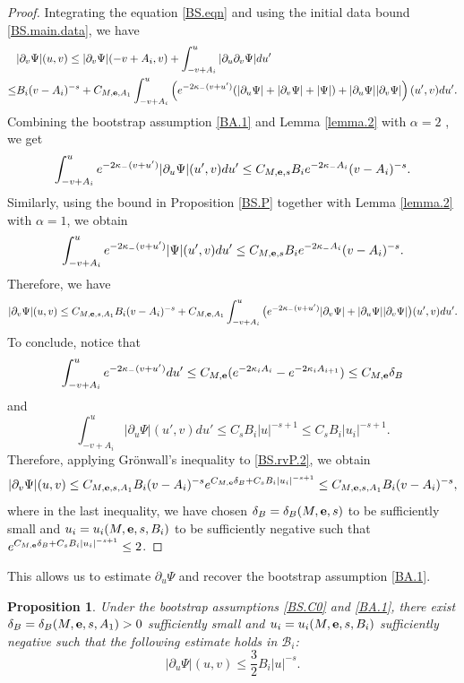 \documentclass[10pt, reqno]{amsart}
\newtheorem{proposition}[theorem]{Proposition}
\theoremstyle{definition}
\theoremstyle{remark}
\numberwithin{equation}{section}
\newcommand{\rd}{\partial}
\newcommand{\0}{\emptyset}
\newcommand{\alp}{\alpha}
\newcommand{\f}{\frac}
\newcommand{\de}{\delta}
\begin{document}
\begin{proof}
Integrating the equation \eqref{BS.eqn} and using the initial data bound \eqref{BS.main.data}, we have
\begin{equation}\label{BS.rvP.1}
\begin{split}
&|\rd_v\Psi|(u,v)\leq |\rd_v\Psi|(-v+A_i,v)+\int_{-v+A_i}^u |\rd_u\rd_v\Psi| du'\\
\leq &B_i(v-A_i)^{-s}+C_{M,{\bf e},A_1}\int_{-v+A_i}^u \left(e^{-2\kappa_-(v+u')}(|\rd_u\Psi|+|\rd_v\Psi|+|\Psi|)+|\rd_u\Psi||\rd_v\Psi|\right)(u',v) du'.
\end{split}
\end{equation}
Combining the bootstrap assumption \eqref{BA.1} and Lemma \ref{lemma.2} with $\alp=2$ , we get
$$\int_{-v+A_i}^u e^{-2\kappa_-(v+u')}|\rd_u\Psi|(u',v) du' \leq C_{M,{\bf e},s} B_i e^{-2\kappa_- A_i} (v-A_i)^{-s}.$$
Similarly, using the bound in Proposition \ref{BS.P} together with Lemma \ref{lemma.2} with $\alp=1$, we obtain
$$\int_{-v+A_i}^u e^{-2\kappa_-(v+u')}|\Psi|(u',v) du' \leq C_{M,{\bf e},s} B_i e^{-2\kappa_- A_i} (v-A_i)^{-s}.$$
Therefore, we have
\begin{equation}\label{BS.rvP.2}
|\rd_v\Psi|(u,v)\leq C_{M,{\bf e},s,A_1}B_i(v-A_i)^{-s}+C_{M,{\bf e},A_1}\int_{-v+A_i}^u \big(e^{-2\kappa_-(v+u')}|\rd_v\Psi|+|\rd_u\Psi||\rd_v\Psi|\big)(u',v) du'.
\end{equation}
To conclude, notice that
$$\int_{-v+A_i}^u e^{-2\kappa_-(v+u')} du'\leq C_{M,{\bf e}}(e^{-2\kappa_i A_i}-e^{-2\kappa_i A_{i+1}})\leq C_{M,{\bf e}}\delta_B$$
and
$$\int_{-v+A_i}^u |\rd_u\Psi|(u',v) du'\leq C_s B_i|u|^{-s+1}\leq C_s B_i|u_i|^{-s+1}.$$
Therefore, applying Gr\"onwall's inequality to \eqref{BS.rvP.2}, we obtain
$$|\rd_v\Psi|(u,v)\leq C_{M,{\bf e},s,A_1}B_i(v-A_i)^{-s} e^{C_{M,{\bf e}}\delta_B+C_sB_i|u_i|^{-s+1}}\leq C_{M,{\bf e},s,A_1}B_i(v-A_i)^{-s},$$
where in the last inequality, we have chosen $\delta_B=\delta_B(M,{\bf e},s)$ to be sufficiently small and $u_i=u_i(M,{\bf e},s,B_i)$ to be sufficiently negative such that $e^{C_{M,{\bf e}}\delta_B+C_sB_i|u_i|^{-s+1}}\leq 2$.
\end{proof}
This allows us to estimate $\rd_u\Psi$ and recover the bootstrap assumption \eqref{BA.1}.
\begin{proposition}\label{BS.ruP}
Under the bootstrap assumptions \eqref{BS.C0} and \eqref{BA.1}, there exist $\de_B=\de_B(M,{\bf e},s,A_1)>0$ sufficiently small and $u_i=u_i(M,{\bf e},s,B_i)$ sufficiently negative such that the following estimate holds in $\mathcal B_i$:
$$|\rd_u\Psi|(u,v)\leq \f 32 B_i |u|^{-s}.$$
\end{proposition}
\end{document}
